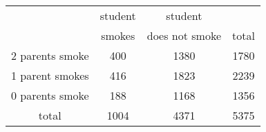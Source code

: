 \documentclass[a4paper,11pt]{article}
\begin{document}
 
\begin{table}[htbp]
\begin{center}
\begin{tabular}{c|c c|c}

\multicolumn{1}{l|}{} & student & student & \multicolumn{1}{l}{} \\
\multicolumn{1}{l|}{} & smokes & does not smoke & total \\ \hline
2 parents smoke & 400 & 1380 & 1780 \\
1 parent smokes & 416 & 1823 & 2239 \\
0 parents smoke & 188 & 1168 & 1356 \\ \hline
total & 1004 & 4371 & 5375

\end{tabular}
\end{center}
\end{table}
 
\end{document}
